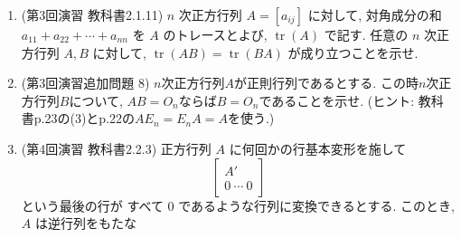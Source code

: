 \documentclass[dvipdfmx,a4paper,11pt]{article} %
\theoremstyle{definition}
\begin{document}
\begin{enumerate}[label=\textbf{問題}\arabic*.]
(2) \(AB, BA, BC, CB, CA, AC\) の \(6\) 個のうち, 行列の積として定まるもの
すべてに対して積を計算せよ.
\item (第3回演習 教科書2.1.11) \(n\) 次正方行列 \(A=[a_{ij}]\) に対して, 対角成分の和
\(
a_{11}+a_{22}+\cdots+a_{nn}
\)
を \(A\) のトレースとよび, \(\operatorname{tr}(A)\) で記す. 任意の \(n\) 次正方行列 \(A,B\) に対して,
\(
\operatorname{tr}(AB)=\operatorname{tr}(BA)
\)
が成り立つことを示せ.
\item (第3回演習追加問題 8) $n$次正方行列$A$が正則行列であるとする.
この時$n$次正方行列$B$について, 
$AB=O_{n}$ならば$B=O_n$であることを示せ.
(ヒント: 教科書p.23の(3)とp.22の$AE_n=E_nA=A$を使う.)
\item (第4回演習 教科書2.2.3) 正方行列 \(A\) に何回かの行基本変形を施して
\[
\begin{bmatrix}
A'\\
0 \ \cdots \ 0
\end{bmatrix}
\]
という最後の行が
すべて \(0\) であるような行列に変換できるとする. このとき, \(A\) は逆行列をもたな

\end{enumerate}
\end{document}
